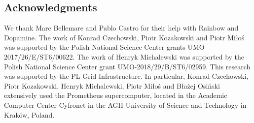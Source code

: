\documentclass{article} %
\begin{document}
















\subsection*{Acknowledgments} We thank Marc Bellemare and Pablo Castro for their help with Rainbow and Dopamine. The work of Konrad Czechowski, Piotr Kozakowski and Piotr Miłoś was supported by the Polish National Science Center grants UMO-2017/26/E/ST6/00622. The work of Henryk Michalewski was supported by the Polish National Science Center grant UMO-2018/29/B/ST6/02959. This research was supported by the PL-Grid Infrastructure. In particular, Konrad Czechowski, Piotr Kozakowski, Henryk Michalewski, Piotr Miłoś and Błażej Osiński extensively used the Prometheus supercomputer, located in the Academic Computer Center
Cyfronet in the AGH University of Science and Technology in Kraków, Poland. 






\end{document}
